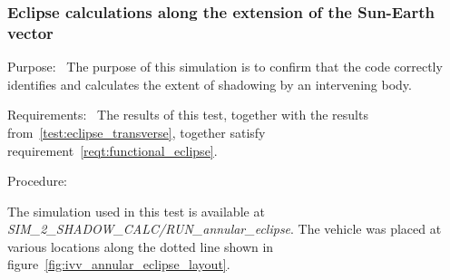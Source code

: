   \subsubsection{Eclipse calculations along the extension of the Sun-Earth vector}
    \label{test:eclipse_annular}
    \begin{description}
      \item{Purpose:}\ \newline
        The purpose of this simulation is to confirm that the code
        correctly identifies and calculates the extent of shadowing by an
        intervening body.
      \item{Requirements:}\ \newline
        The results of this test, together with the results
        from~\ref{test:eclipse_transverse}, together satisfy
        requirement~\ref{reqt:functional_eclipse}.
      \item{Procedure:}\ \newline

The simulation used in this test is available at \textit{SIM\_2\_SHADOW\_CALC/RUN\_annular\_eclipse}.
        The vehicle was placed at various locations along the dotted line shown
        in figure~\ref{fig:ivv_annular_eclipse_layout}.


\end{description}

